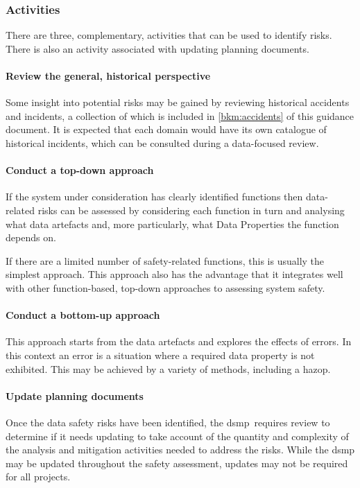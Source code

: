 \subsubsection{Activities}
There are three, complementary, activities that can be used to identify risks. There is also an activity associated with updating planning documents.

\paragraph{Review the general, historical perspective}
Some insight into potential risks may be gained by reviewing historical accidents and incidents, a collection of which is included in
\autoref{bkm:accidents} of this guidance document. It is expected that each domain would have its own catalogue of historical incidents, which can be consulted during a data-focused review.

\paragraph{Conduct a top-down approach}
If the system under consideration has clearly identified functions then data-related risks can be assessed by considering each function in turn and analysing what \glspl{data artefact} and, more particularly, what Data Properties the function depends on.

If there are a limited number of safety-related functions, this is usually the simplest approach. This approach also has the advantage that it integrates well with other function-based, top-down approaches to assessing system safety. 

\paragraph{Conduct a bottom-up approach}
This approach starts from the \glspl{data artefact} and explores the effects of \glspl{error}. In this context an error is a situation where a required \gls{data property} is not exhibited. This may be achieved by a variety of methods, including a \gls{hazop}.

\paragraph{Update planning documents}
Once the data safety risks have been identified, the \cbstart\gls{dsmp}\cbend\ requires review to determine if it needs
updating to take account of the quantity and complexity of the analysis and mitigation activities needed to address the risks. While the \gls{dsmp} may be updated throughout the \gls{safety assessment}, updates may not be required for all projects.

